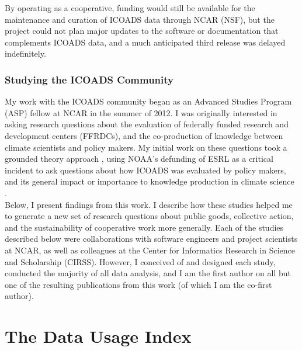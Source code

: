 \documentclass[thesis,tocnosub,noragright,centerchapter,12pt]{uiucecethesis09}
\begin{document}
By operating as a cooperative, funding would still be available for the
maintenance and curation of ICOADS data through NCAR (NSF), but the
project could not plan major updates to the software or documentation
that complements ICOADS data, and a much anticipated third release was
delayed indefinitely.\\

\subsubsection*{Studying the ICOADS Community}

My work with the ICOADS community began as an Advanced Studies Program
(ASP) fellow at NCAR in the summer of 2012. I was originally interested
in asking research questions about the evaluation of federally funded
research and development centers (FFRDCs), and the co-production of
knowledge between climate scientists and policy
makers. My initial work on these questions took a grounded theory
approach \citep{corbin2008basics}, using NOAA's defunding of ESRL as a critical incident to
ask questions about how ICOADS was evaluated by policy makers, and its
general impact or importance to knowledge production in climate science
\citep{flanagan1954critical}.\\

Below, I present findings from this work. I
describe how these studies helped me to generate a new set of research
questions about public goods, collective action, and the sustainability
of cooperative work more generally. Each of the studies described below
were collaborations with software engineers and project scientists at
NCAR, as well as colleagues at the Center for Informatics Research in
Science and Scholarship (CIRSS). However, I conceived of and designed
each study, conducted the majority of all data analysis, and I am the
first author on all but one of the resulting publications from this work
(of which I am the co-first author).

\section{The Data Usage Index}
\end{document}
